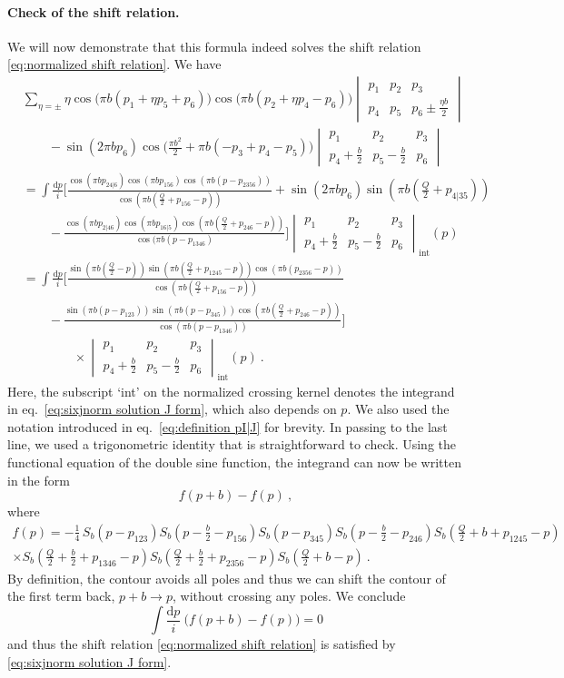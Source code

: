 \documentclass[12pt,a4paper]{article}
\newcommand{\be}{\begin{equation}}
\newcommand{\ee}{\end{equation}}
\renewcommand\d{\text{d}}
\newcommand{\sixjnorm}[6]{\begin{vmatrix}
#1 & #2 & #3 \\
#4 & #5 & #6
\end{vmatrix}
}
\begin{document}
\paragraph{Check of the shift relation.} We will now demonstrate that this formula indeed solves the shift relation \eqref{eq:normalized shift relation}. We have
\begin{align}
    &\!\!\sum_{\eta=\pm} \eta \cos\big(\pi b(p_1+\eta p_5+p_6)\big)\cos\big(\pi b(p_2+\eta p_4-p_6)\big) \sixjnorm{p_1}{p_2}{p_3}{p_4}{p_5}{p_6 \pm \frac{ \eta b}{2}} \nonumber \\
    &\qquad -\sin(2\pi b p_6) \cos\big(\tfrac{\pi b^2}{2}+\pi b(-p_3+p_4-p_5)\big) \sixjnorm{p_1}{p_2}{p_3}{p_4+\frac{b}{2}}{p_5-\frac{b}{2}}{p_6} \\
    &=\int \frac{\d p}{i}\bigg[ \frac{\cos(\pi bp_{24|6})\cos(\pi b p_{156})\cos(\pi b(p-p_{2356}))}{\cos(\pi b(\frac{Q}{2}+p_{156}-p))}+\sin(2\pi b p_6)\sin(\pi b(\tfrac{Q}{2}+p_{4|35}))\nonumber\\
    &\qquad-\frac{\cos(\pi bp_{2|46})\cos(\pi bp_{16|5})\cos(\pi b(\frac{Q}{2}+p_{246}-p))}{\cos(\pi b(p-p_{1346})}\bigg] \sixjnorm{p_1}{p_2}{p_3}{p_4+\frac{b}{2}}{p_5-\frac{b}{2}}{p_6}_\text{int}\!\!\!\!\!(p) \\
    &=\int \frac{\d p}{i} \bigg[ \frac{\sin(\pi b(\frac{Q}{2}-p))\sin(\pi b(\frac{Q}{2}+p_{1245}-p))\cos(\pi b(p_{2356}-p))}{\cos(\pi b(\frac{Q}{2}+p_{156}-p))}\nonumber\\
    &\qquad-\frac{\sin(\pi b(p-p_{123}))\sin(\pi b(p-p_{345}))\cos(\pi b(\frac{Q}{2}+p_{246}-p))}{\cos(\pi b(p-p_{1346}))}\bigg] \nonumber\\
    &\qquad\qquad\times\sixjnorm{p_1}{p_2}{p_3}{p_4+\frac{b}{2}}{p_5-\frac{b}{2}}{p_6}_\text{int}\!\!\!\!\!(p)\ .
\end{align}
Here, the subscript `int' on the normalized crossing kernel denotes the integrand in eq.~\eqref{eq:sixjnorm solution J form}, which also depends on $p$. We also used the notation introduced in eq.~\eqref{eq:definition pI|J} for brevity.
In passing to the last line, we used a trigonometric identity that is straightforward to check.
Using the functional equation of the double sine function, the integrand can now be written in the form
\be 
f(p+b)-f(p)\ ,
\ee
where
\begin{multline}
    f(p)=-\frac{1}{4}\, S_b(p-p_{123})S_b(p-\tfrac{b}{2}-p_{156})S_b(p-p_{345}) S_b(p-\tfrac{b}{2}-p_{246})S_b(\tfrac{Q}{2}+b+p_{1245}-p) \\ \times S_b(\tfrac{Q}{2}+\tfrac{b}{2}+p_{1346}-p) S_b(\tfrac{Q}{2}+\tfrac{b}{2}+p_{2356}-p)S_b(\tfrac{Q}{2}+b-p)\ .
\end{multline}
By definition, the contour avoids all poles and thus we can shift the contour of the first term back, $p+b \to p$, without crossing any poles. We conclude 
\be  
\int \frac{\mathrm{d}p}{i} \ \big(f(p+b)-f(p)\big)=0
\ee
and thus the shift relation \eqref{eq:normalized shift relation} is satisfied by \eqref{eq:sixjnorm solution J form}.
\end{document}
